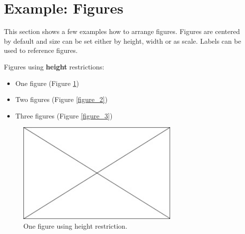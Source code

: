 \section{Example: Figures}
\label{sec11}


This section shows a few examples how to arrange figures. Figures are centered by default and size can be set either by height, width or as scale. Labels can be used to reference figures.

Figures using \textbf{height} restrictions: 
\begin{itemize}
	\item One figure (Figure \ref{figure_1})
	\item Two figures (Figure \ref{figure_2})
	\item Three figures (Figure \ref{figure_3})
\end{itemize}

\begin{figure}[H] %
	\begin{center}
		\includegraphics[height=5cm]{Figures/Chapter_1/placeholder} \caption{
			\label{figure_1} One figure using height restriction.}
		\vspace{-0.5cm}
	\end{center}
\end{figure}

